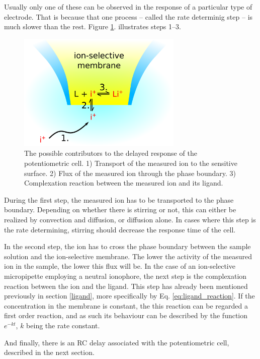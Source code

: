 Usually only one of these can be observed in the response of a particular type of electrode. That is because that one process -- called the rate determinig step -- is much slower than the rest. Figure \ref{fig:rds}. illustrates steps 1--3.
\begin{figure}[t]
\centering
\includegraphics[width=0.7\textwidth]{img/rds.eps}
\caption[The possible contributors to the delayed response of the potentiometric cell.]{The possible contributors to the delayed response of the potentiometric cell. 1) Transport of the measured ion to the sensitive surface. 2) Flux of the measured ion through the phase boundary. 3) Complexation reaction between the measured ion and its ligand.}
\label{fig:rds}
\end{figure}
During the first step, the measured ion has to be transported to the phase boundary. Depending on whether there is stirring or not, this can either be realized by convection and diffusion, or diffusion alone. In cases where this step is the rate determining, stirring should decrease the response time of the cell.

In the second step, the ion has to cross the phase boundary between the sample solution and the ion-selective membrane. The lower the activity of the measured ion in the sample, the lower this flux will be. In the case of an ion-selective micropipette employing a neutral ionophore, the next step is the complexation reaction between the ion and the ligand. This step has already been mentioned previously in section \ref{ligand}, more specifically by Eq. \ref{eq:ligand_reaction}. If the concentration in the membrane is constant, the this reaction can be regarded a first order reaction, and as such its behaviour can be described by the function $e^{-kt}$, $k$ being the rate constant.

And finally, there is an RC delay associated with the potentiometric cell, described in the next section.

